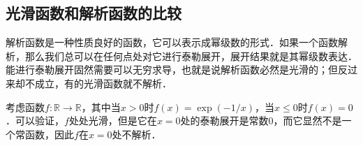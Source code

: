 \subsection{光滑函数和解析函数的比较}

解析函数是一种性质良好的函数，它可以表示成幂级数的形式．如果一个函数解析，那么我们总可以在任何点处对它进行泰勒展开，展开结果就是其幂级数表达．能进行泰勒展开固然需要可以无穷求导，也就是说解析函数必然是光滑的；但反过来却不成立，有的光滑函数就不解析．

\begin{example}{}\label{SmthM_ex1}
考虑函数$f:\mathbb{R}\rightarrow\mathbb{R}$，其中当$x>0$时$f(x)=\exp{(-1/x)}$，当$x\leq 0$时$f(x)=0$．可以验证，$f$处处光滑，但是它在$x=0$处的泰勒展开是常数$0$，而它显然不是一个常函数，因此$f$在$x=0$处不解析．
\end{example}




